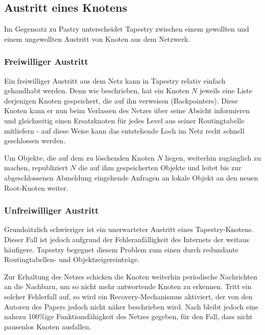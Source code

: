 \subsection{Austritt eines Knotens}
Im Gegensatz zu Pastry unterscheidet Tapestry zwischen einem gewollten und einem
ungewollten Austritt von Knoten aus dem Netzwerk.

\subsubsection{Freiwilliger Austritt}
Ein freiwilliger Austritt aus dem Netz kann in Tapestry relativ einfach
gehandhabt werden. Denn wie beschrieben, hat ein Knoten $N$ jeweils eine Liste
derjenigen Knoten gespeichert, die auf ihn verweisen (Backpointers). Diese
Knoten kann er nun beim Verlassen des Netzes über seine Absicht informieren und
gleichzeitig einen Ersatzknoten für jedes Level aus seiner Routingtabelle
mitliefern - auf diese Weise kann das entstehende Loch im Netz recht schnell
geschlossen werden.

Um Objekte, die auf dem zu löschenden Knoten $N$ liegen, weiterhin zugänglich 
zu machen, republiziert $N$ die auf ihm gespeicherten Objekte und leitet bis 
zur abgeschlossenen Abmeldung eingehende Anfragen an lokale Objekt an den neuen 
Root-Knoten weiter.

\subsubsection{Unfreiwilliger Austritt}
Grundsätzlich schwieriger ist ein unerwarteter Austritt eines Tapestry-Knotens.
Dieser Fall ist jedoch aufgrund der Fehleranfälligkeit des Internets der weitaus
häufigere. Tapestry begegnet diesem Problem zum einen durch redundante
Routingtabellen- und Objektzeigereinträge.

Zur Erhaltung des Netzes schicken die Knoten weiterhin periodische Nachrichten 
an die Nachbarn, um so nicht mehr antwortende Knoten zu erkennen. Tritt ein 
solcher Fehlerfall auf, so wird ein Recovery-Mechanismus aktiviert, der von den 
Autoren des Papers jedoch nicht näher beschrieben wird. Nach 
\cite[S.~44]{TapestryTR} bleibt jedoch eine nahezu 100\%ige Funktionsfähigkeit 
des Netzes gegeben, für den Fall, dass nicht pausenlos Knoten ausfallen.